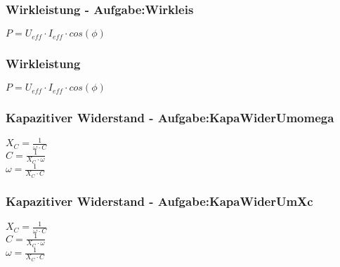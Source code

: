 \subsubsection{Wirkleistung - Aufgabe:Wirkleis} 
\begin{minipage}{0.45\textwidth} 
$ P = U_{eff}\cdot I_{eff}\cdot cos(\phi ) $\\ 
\end{minipage} 
\begin{minipage}{0.45\textwidth} 
 
\end{minipage} 
\subsubsection{Wirkleistung} 
\begin{minipage}{0.45\textwidth} 
$ P = U_{eff}\cdot I_{eff}\cdot cos(\phi ) $\\ 
\end{minipage} 
\begin{minipage}{0.45\textwidth} 
 
\end{minipage} 
\subsubsection{Kapazitiver Widerstand - Aufgabe:KapaWiderUmomega} 
\begin{minipage}{0.45\textwidth} 
$ X_{C} = \frac{ 1}{\omega \cdot C} $\\ 
$ C = \frac{ 1}{X_{C} \cdot \omega } $\\ 
$ \omega = \frac{ 1}{X_{C} \cdot C} $\\ 
\end{minipage} 
\begin{minipage}{0.45\textwidth} 
 
\end{minipage} 
\subsubsection{Kapazitiver Widerstand - Aufgabe:KapaWiderUmXc} 
\begin{minipage}{0.45\textwidth} 
$ X_{C} = \frac{ 1}{\omega \cdot C} $\\ 
$ C = \frac{ 1}{X_{C} \cdot \omega } $\\ 
$ \omega = \frac{ 1}{X_{C} \cdot C} $\\ 
\end{minipage} 
\begin{minipage}{0.45\textwidth} 
 
\end{minipage} 
